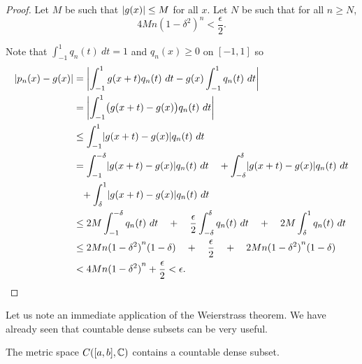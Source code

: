 \begin{proof}
Let $M$ be such that $\lvert {g(x)} \rvert \leq M$ for all $x$.  Let $N$ be
such that for all $n \geq N$,
\begin{equation*}
4M n{(1-\delta^2)}^n < \frac{\epsilon}{2} .
\end{equation*}

Note that 
$\int_{-1}^1 q_n(t) ~ dt = 1$ and $q_n(x) \geq 0$ on $[-1,1]$ so
\begin{equation*}
\begin{split}
\lvert {p_n(x)-g(x)} \rvert & =
\left\lvert {\int_{-1}^1 g(x+t)q_n(t) ~ dt
-g(x)\int_{-1}^1 q_n(t) ~ dt} \right\rvert \\
& =
\left\lvert {\int_{-1}^1 \bigl(g(x+t)-g(x)\bigr)q_n(t) ~ dt} \right\rvert \\
& \leq
\int_{-1}^1 \lvert {g(x+t)-g(x)} \rvert q_n(t) ~ dt \\
& =
\int_{-1}^{-\delta} \lvert {g(x+t)-g(x)} \rvert q_n(t) ~ dt
\quad +
\int_{-\delta}^{\delta} \lvert {g(x+t)-g(x)} \rvert q_n(t) ~ dt
\\
& \phantom{\leq} +
\int_{\delta}^1 \lvert {g(x+t)-g(x)} \rvert q_n(t) ~ dt \\
& \leq
2M
\int_{-1}^{-\delta} q_n(t) ~ dt
\quad
+
\quad
\frac{\epsilon}{2}
\int_{-\delta}^{\delta} q_n(t) ~ dt
\quad
+
\quad
2M
\int_{\delta}^1 q_n(t) ~ dt \\
& \leq
2M n{(1-\delta^2)}^n(1-\delta)
\quad
+
\quad
\frac{\epsilon}{2}
\quad
+
\quad
2M n{(1-\delta^2)}^n(1-\delta) \\
& <
4M n{(1-\delta^2)}^n
+
\frac{\epsilon}{2}
< \epsilon . \qedhere
\end{split}
\end{equation*}
\end{proof}

Let us note an immediate application of the Weierstrass theorem.  We have
already seen that countable dense subsets can be very useful.

\begin{cor}
The metric space $C([a,b],{\mathbb{C}})$ contains a countable dense subset.
\end{cor}

